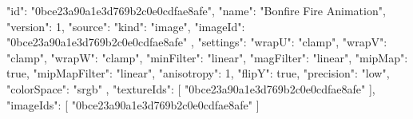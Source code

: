 {
  "id": "0bce23a90a1e3d769b2c0e0cdfae8afe",
  "name": "Bonfire Fire Animation",
  "version": 1,
  "source": {
    "kind": "image",
    "imageId": "0bce23a90a1e3d769b2c0e0cdfae8afe"
  },
  "settings": {
    "wrapU": "clamp",
    "wrapV": "clamp",
    "wrapW": "clamp",
    "minFilter": "linear",
    "magFilter": "linear",
    "mipMap": true,
    "mipMapFilter": "linear",
    "anisotropy": 1,
    "flipY": true,
    "precision": "low",
    "colorSpace": "srgb"
  },
  "textureIds": [
    "0bce23a90a1e3d769b2c0e0cdfae8afe"
  ],
  "imageIds": [
    "0bce23a90a1e3d769b2c0e0cdfae8afe"
  ]
}
